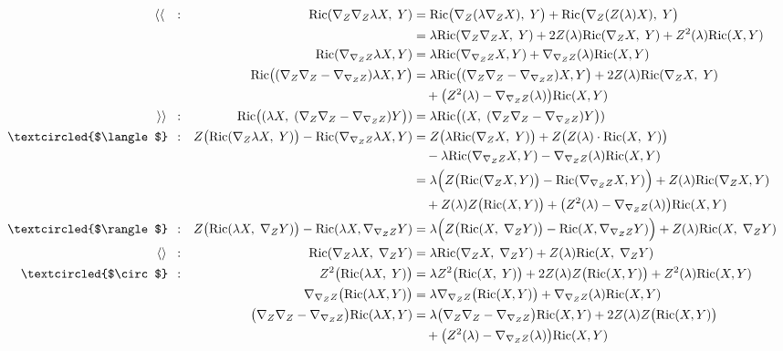 \documentclass[a4paper,11pt]{article}
\newcommand{\R}{{\mathrm{Ric}}}
\begin{document}
\begin{align*}
    \langle\langle \quad:&&
    \R(\nabla_Z\nabla_Z \lambda X,\;Y)
    &= \R\big(\nabla_Z(\lambda\nabla_Z  X),\;Y\big) + \R\big(\nabla_Z (Z(\lambda) X),\;Y\big)\\
    &&&= \lambda\R(\nabla_Z\nabla_Z  X,\;Y) + 2 Z(\lambda)\R(\nabla_Z  X,\;Y) + Z^2(\lambda) \R(X,Y)\\
    &&\R(\nabla_{\nabla_ZZ}\lambda X,Y)
    &= \lambda \R(\nabla_{\nabla_ZZ}X,Y) + \nabla_{\nabla_ZZ}(\lambda)\R(X,Y)\\
    &&\R\big((\nabla_Z\nabla_Z-\nabla_{\nabla_ZZ})\lambda X,Y\big)
    &= \lambda \R\big((\nabla_Z\nabla_Z-\nabla_{\nabla_ZZ}) X,Y\big) + 2 Z(\lambda)\R(\nabla_Z  X,\;Y) 
    \\&&&\quad + \big(Z^2(\lambda)- \nabla_{\nabla_ZZ}(\lambda)\big)\R(X,Y)\\
    \rangle\rangle \;\;:&& 
    \R\big((\lambda X,\;(\nabla_Z\nabla_Z-\nabla_{\nabla_ZZ})Y\big))
    &= \lambda \R\big((X,\;(\nabla_Z\nabla_Z-\nabla_{\nabla_ZZ})Y\big))\\
    \textcircled{$\langle$} \;\,:&&
    Z\big(\R(\nabla_Z \lambda X,\;Y)\big) - \R(\nabla_{\nabla_ZZ}\lambda X,Y)
    &= Z\big(\lambda\R(\nabla_Z X,\;Y)\big)
    + Z\big(Z(\lambda) \cdot \R(X,\;Y)\big)\\
    &&&\quad - \lambda \R(\nabla_{\nabla_ZZ}X,Y) - \nabla_{\nabla_ZZ}(\lambda)\R(X,Y)\\
    &&&= \lambda \Big(Z\big(\R(\nabla_Z X,Y)\big)-
    \R(\nabla_{\nabla_ZZ}X,Y) \Big)+ Z(\lambda) \R(\nabla_Z X, Y)\\
    &&&\quad + Z(\lambda) Z\big(\R(X,Y)\big) + \big(Z^2(\lambda) - \nabla_{\nabla_ZZ}(\lambda)\big)\R(X,Y) \\
    \textcircled{$\rangle$} \;\,:&&
    Z\big(\R(\lambda X,\;\nabla_ZY)\big)- \R(\lambda X,\nabla_{\nabla_ZZ}Y)
    &= \lambda \Big(Z\big(\R(X,\;\nabla_ZY)\big)- \R(X,\nabla_{\nabla_ZZ}Y)\Big)
    + Z(\lambda)\R(X,\;\nabla_ZY)\\
    \langle\rangle \;\;:&&
    \R(\nabla_Z \lambda X, \; \nabla_Z Y)
    &= \lambda \R(\nabla_Z X, \; \nabla_Z Y)
    + Z(\lambda) \R(X,\; \nabla_Z Y)\\
    \textcircled{$\circ$} \;\,:&&
    Z^2\big(\R(\lambda X,\;Y)\big) &= \lambda Z^2\big(\R( X,\;Y)\big)
    + 2 Z(\lambda) Z\big(\R(X,Y)\big)
    + Z^2(\lambda) \R(X,Y)\\
    &&\nabla_{\nabla_ZZ}\big(\R(\lambda X,Y)\big)
    &=\lambda\nabla_{\nabla_ZZ}\big(\R( X,Y)\big)
    + \nabla_{\nabla_ZZ}(\lambda)\R(X,Y)\\
    && \big(\nabla_Z\nabla_Z-\nabla_{\nabla_Z Z}\big)\R(\lambda X,Y)
    &= \lambda \big(\nabla_Z\nabla_Z-\nabla_{\nabla_Z Z}\big)\R(X,Y) + 2 Z(\lambda) Z\big(\R(X,Y)\big)\\
    &&&\quad + \big(Z^2(\lambda)-\nabla_{\nabla_ZZ}(\lambda)\big) \R(X,Y)
\end{align*}
\end{document}
